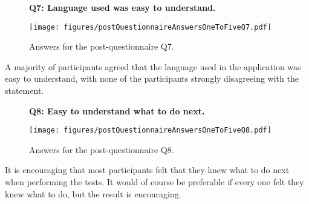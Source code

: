     \begin{figure}[h!]
      \textbf{Q7: Language used was easy to understand.}
      \begin{center}
        \texttt{[image: figures/postQuestionnaireAnswersOneToFiveQ7.pdf]}
        \vspace{-1cm}
        \caption{Answers for the post-questionnaire Q7.}
      \end{center}
    \end{figure}

    A majority of participants agreed that the language used in the
    application was easy to understand, with none of the participants
    strongly disagreeing with the statement.

    \begin{figure}[h!]
      \textbf{Q8: Easy to understand what to do next.}
      \begin{center}
        \texttt{[image: figures/postQuestionnaireAnswersOneToFiveQ8.pdf]}
        \vspace{-1cm}
        \caption{Answers for the post-questionnaire Q8.}
      \end{center}
    \end{figure}

    It is encouraging that most participants felt that they knew what to do
    next when performing the tests. It would of course be preferable if
    every one felt they knew what to do, but the result is encouraging.
